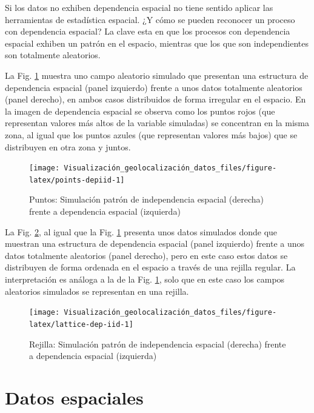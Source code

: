 \documentclass[
]{book}
\theoremstyle{definition}
\theoremstyle{definition}
\theoremstyle{definition}
\theoremstyle{definition}
\theoremstyle{remark}
\begin{document}
Si los datos no exhiben dependencia espacial no tiene sentido aplicar las
herramientas de estadística espacial. ¿Y cómo se pueden reconocer un proceso con
dependencia espacial? La clave esta en que los procesos con dependencia espacial
exhiben un patrón en el espacio, mientras que los que son independientes son
totalmente aleatorios.

La Fig. \ref{fig:points-depiid} muestra uno campo aleatorio simulado que
presentan una estructura de dependencia espacial (panel izquierdo) frente a unos
datos totalmente aleatorios (panel derecho), en ambos casos distribuidos de
forma irregular en el espacio. En la imagen de dependencia espacial se observa
como los puntos rojos (que representan valores más altos de la variable
simuladas) se concentran en la misma zona, al igual que los puntos azules (que
representan valores más bajos) que se distribuyen en otra zona y juntos.

\begin{figure}

{\centering \texttt{[image: Visualización\_geolocalización\_datos\_files/figure-latex/points-depiid-1]} 

}

\caption{Puntos: Simulación patrón de independencia espacial (derecha) frente a dependencia espacial (izquierda)}\label{fig:points-depiid}
\end{figure}

La Fig. \ref{fig:lattice-dep-iid}, al igual que la Fig.
\ref{fig:points-depiid} presenta unos datos simulados donde que muestran una
estructura de dependencia espacial (panel izquierdo) frente a unos datos
totalmente aleatorios (panel derecho), pero en este caso estos datos se
distribuyen de forma ordenada en el espacio a través de una rejilla regular. La
interpretación es análoga a la de la Fig. \ref{fig:points-depiid}, solo que en
este caso los campos aleatorios simulados se representan en una rejilla.

\begin{figure}

{\centering \texttt{[image: Visualización\_geolocalización\_datos\_files/figure-latex/lattice-dep-iid-1]} 

}

\caption{Rejilla: Simulación patrón de independencia espacial (derecha) frente a dependencia espacial (izquierda)}\label{fig:lattice-dep-iid}
\end{figure}

\hypertarget{datos-espaciales}{%
\section{Datos espaciales}\label{datos-espaciales}}
\end{document}
